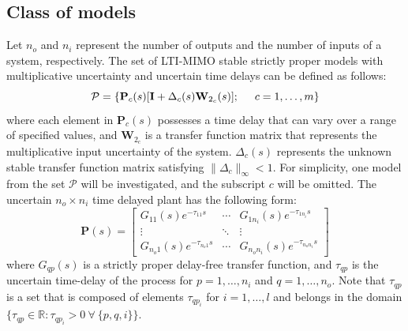 \documentclass[A4, 10pt, conference]{ieeeconf}
\renewcommand{\vec}[1]{\mathbf{#1}}
\begin{document}
\subsection{Class of models}
Let $n_o$ and $n_i$ represent the number of outputs and the number of inputs of a system, respectively. The set of LTI-MIMO stable strictly proper  models with multiplicative uncertainty and  uncertain time delays can be defined as follows: 
\begin{equation}\label{eq:setpmimo}
\mathcal{P}=\{\vec{P}_c(s)[\vec{I}+\Delta_c(s) \vec{W}_{2_{c}}(s)];\hspace{0.5cm} c=1,\ldots,m\}
\end{equation}
where each element in $\vec{P}_c(s)$ possesses a time delay that can vary over a range of specified values, and $\vec{W}_{2_{c}}$ is a transfer function matrix that represents the multiplicative input uncertainty of the system. $\Delta_c(s)$ represents the unknown stable transfer function matrix satisfying $\| \Delta_c \|_{\infty} < 1 $. For simplicity, one model from the set $\mathcal{P}$ will be investigated, and the subscript $c$ will be omitted. The uncertain $n_o \times n_i$ time delayed plant has the following form:
\begin{equation}\label{eq:mimo_p}
\vec{P}(s)=
\begin{bmatrix}
G_{11}(s)e^{-\tau_{11} s} & \cdots & G_{1n_{i}}(s)e^{-\tau_{1n_{i}} s} \\ \vdots & \ddots & \vdots \\ G_{n_{o}1}(s)e^{-\tau_{n_{o}1} s} & \cdots & G_{n_{o}n_{i}}(s)e^{-\tau_{n_{o}n_{i}} s}
\end{bmatrix}
\end{equation}
where $G_{qp}(s)$ is a strictly proper delay-free transfer function, and $\tau_{qp}$ is the uncertain time-delay of the process for $p=1,\ldots, n_i$ and $q=1,\ldots, n_o$. Note that $\tau_{qp}$ is a set that is composed of elements $\tau_{qp_{i}}$ for $i=1,\ldots, l$ and belongs in the domain $\{ \tau_{qp} \in \mathbb{R}:\tau_{qp_{i}} > 0 \ \forall \: \{p,q,i\} \}$.
\end{document}
